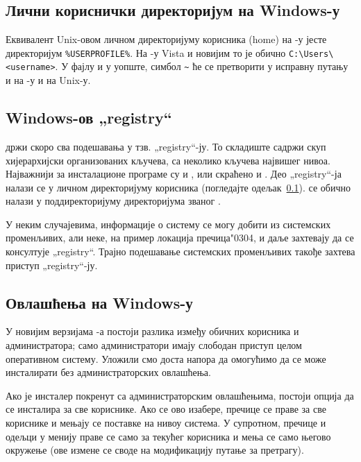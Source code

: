 \documentclass{article}
\begin{document}
\subsection{Лични кориснички директоријум на Windows-у}
\label{sec:winhome}

Еквивалент Unix-овом личном директоријуму корисника (home) на
\Windows{}-у јесте директоријум \verb|%USERPROFILE%|. На \Windows{}-у
Vista и новијим то је обично \verb|C:\Users\<username>|. У
фајлу  и у \KPS{} уопште, симбол \verb|~| ће се
претворити у исправну путању и на \Windows{}-у и на Unix-у.


\subsection{Windows-ов „registry“}
\label{sec:registry}

\Windows{} држи скоро сва подешавања у тзв. „registry“-ју. То
складиште садржи скуп хијерархијски организованих кључева, са
неколико кључева највишег нивоа. Најважнији за инсталационе програме
су  и , или скраћено
 и . Део „registry“-ја  налази се у
личном директоријуму корисника (погледајте одељак~\ref{sec:winhome}).
 се обично налази у поддиректоријуму директоријума званог
\Windows{}.

У неким случајевима, информације о систему се могу добити из
системских променљивих, али неке, на пример локација
пречица\char"0304, и даље захтевају да се консултује „registry“.
Трајно подешавање системских променљивих такође захтева приступ
„registry“-ју.


\subsection{Овлашћења на Windows-у}
\label{sec:winpermissions}

У новијим верзијама \Windows{}-а постоји разлика између обичних
корисника и администратора; само администратори имају слободан
приступ целом оперативном систему. Уложили смо доста напора да
омогућимо да се \TL{} може инсталирати без администраторских
овлашћења.

Ако је инсталер покренут са администраторским овлашћењима, постоји
опција да се \TL{} инсталира за све кориснике. Ако се ово изабере,
пречице се праве за све кориснике и мењају се поставке на нивоу
система. У супротном, пречице и одељци у менију праве се само за
текућег корисника и мења се само његово окружење (ове измене се 
своде на модификацију путање за претрагу).
\end{document}
